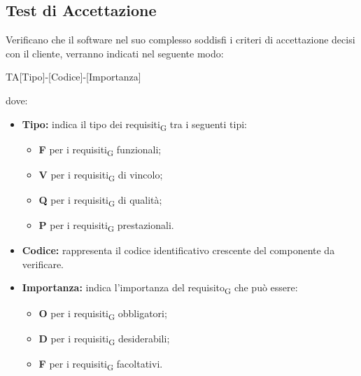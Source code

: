 \subsection{Test di Accettazione}
Verificano che il software nel suo complesso soddisfi i criteri di accettazione decisi con il cliente, verranno indicati nel seguente modo:\\
\begin{center}
	TA[Tipo]-[Codice]-[Importanza]\\
\end{center}
dove:
\begin{itemize}
    \item \textbf{Tipo:} indica il tipo dei requisiti\textsubscript{G} tra i seguenti tipi:
    \begin{itemize}
        \item \textbf{F} per i requisiti\textsubscript{G} funzionali;
        \item \textbf{V} per i requisiti\textsubscript{G} di vincolo;
        \item \textbf{Q} per i requisiti\textsubscript{G} di qualità;
        \item \textbf{P} per i requisiti\textsubscript{G} prestazionali.
    \end{itemize}
	\item \textbf{Codice:} rappresenta il codice identificativo crescente del componente da verificare.
	\item \textbf{Importanza:} indica l'importanza del requisito\textsubscript{G} che può essere:
		\begin{itemize}
			\item \textbf{O} per i requisiti\textsubscript{G} obbligatori;
			\item \textbf{D} per i requisiti\textsubscript{G} desiderabili;
			\item \textbf{F} per i requisiti\textsubscript{G} facoltativi.
		\end{itemize}
\end{itemize}

